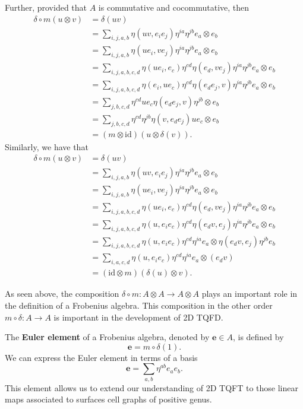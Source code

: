 \documentclass{amsart}
\newcommand{\be}{\begin{equation}}
\newcommand{\ee}{\end{equation}}
\newcommand{\tensor}{\otimes}
\newcommand{\id}{\mathrm{id}}
\newcommand{\eul}{\mathbf{e}}
\theoremstyle{definition}
\begin{document}
Further, provided that $A$ is commutative and cocommutative, then
\begin{align*}
    \delta\circ m(u\tensor v)&=\delta(uv)\\
    &=\sum_{i,j,a,b}\eta(uv,e_ie_j)\eta^{ia}\eta^{jb}e_a\otimes e_b\\
    &=\sum_{i,j,a,b}\eta(ue_i,ve_j)\eta^{ia}\eta^{jb}e_a\otimes e_b\\
    &=\sum_{i,j,a,b,c,d}\eta(ue_i,e_c)\eta^{cd}\eta(e_d,ve_j)\eta^{ia}\eta^{jb}e_a\otimes e_b\\
    &=\sum_{i,j,a,b,c,d}\eta(e_i,ue_c)\eta^{cd}\eta(e_de_j,v)\eta^{ia}\eta^{jb}e_a\otimes e_b\\
    &=\sum_{j,b,c,d}\eta^{cd}ue_c\eta(e_de_j,v)\eta^{jb}\otimes e_b\\
    &=\sum_{j,b,c,d}\eta^{cd}\eta^{jb}\eta(v,e_de_j)ue_c\otimes e_b\\
    &=(m\otimes \id)(u\otimes \delta(v)).
\end{align*}Similarly, we have that
\begin{align*}
    \delta\circ m(u\tensor v)&=\delta(uv)\\
    &=\sum_{i,j,a,b}\eta(uv,e_ie_j)\eta^{ia}\eta^{jb}e_a\otimes e_b\\
    &=\sum_{i,j,a,b}\eta(ue_i,ve_j)\eta^{ia}\eta^{jb}e_a\otimes e_b\\
    &=\sum_{i,j,a,b,c,d}\eta(ue_i,e_c)\eta^{cd}\eta(e_d,ve_j)\eta^{ia}\eta^{jb}e_a\otimes e_b\\
    &=\sum_{i,j,a,b,c,d}\eta(u,e_ie_c)\eta^{cd}\eta(e_dv,e_j)\eta^{ia}\eta^{jb}e_a\otimes e_b\\
    &=\sum_{i,j,a,b,c,d}\eta(u,e_ie_c)\eta^{cd}\eta^{ia}e_a\otimes \eta(e_dv,e_j)\eta^{jb}e_b\\
    &=\sum_{i,a,c,d}\eta(u,e_ie_c)\eta^{cd}\eta^{ia}e_a\otimes (e_dv)\\
    &=(\id\otimes m)(\delta(u)\otimes v).
\end{align*}



As seen above, the composition $\delta\circ m:A\tensor A\longrightarrow A\tensor A$ plays an important role in the definition of a Frobenius algebra. This composition in the other order $m\circ \delta:A\longrightarrow A$ is important in the development of 2D TQFD.


The \textbf{Euler element} of a Frobenius algebra, denoted by $\eul\in A$, is defined by
\be
\eul = m\circ\delta(1).
\ee 
We can express the Euler element in terms of a basis
\be\label{eqn:eulbasis}
\eul = \sum_{a,b}\eta^{ab}e_ae_b.
\ee
    This element allows us to extend our understanding of 2D TQFT to those linear maps associated to surfaces cell graphs of positive genus.
\end{document}
